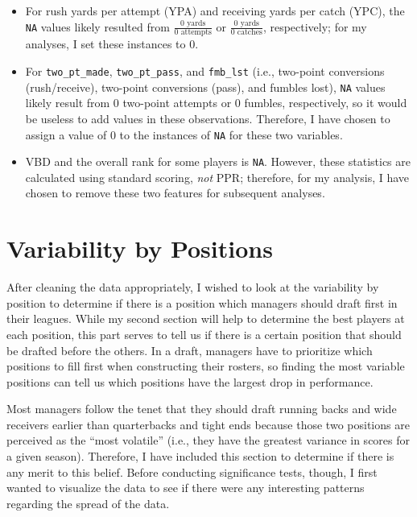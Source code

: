 \documentclass[
]{article}
\providecommand{\tightlist}{%
  \setlength{\itemsep}{0pt}\setlength{\parskip}{0pt}}
\begin{document}
\begin{itemize}
\tightlist
\item
  For rush yards per attempt (YPA) and receiving yards per catch (YPC),
  the \texttt{NA} values likely resulted from
  \(\frac{0 \text{ yards}}{0 \text{ attempts}}\) or
  \(\frac{0 \text{ yards}}{0 \text{ catches}}\), respectively; for my
  analyses, I set these instances to 0.
\item
  For \texttt{two\_pt\_made}, \texttt{two\_pt\_pass}, and
  \texttt{fmb\_lst} (i.e., two-point conversions (rush/receive),
  two-point conversions (pass), and fumbles lost), \texttt{NA} values
  likely result from 0 two-point attempts or 0 fumbles, respectively, so
  it would be useless to add values in these observations. Therefore, I
  have chosen to assign a value of 0 to the instances of \texttt{NA} for
  these two variables.
\item
  VBD and the overall rank for some players is \texttt{NA}. However,
  these statistics are calculated using standard scoring, \emph{not}
  PPR; therefore, for my analysis, I have chosen to remove these two
  features for subsequent analyses.
\end{itemize}

\newpage

\hypertarget{variability-by-positions}{%
\section{Variability by Positions}\label{variability-by-positions}}

After cleaning the data appropriately, I wished to look at the
variability by position to determine if there is a position which
managers should draft first in their leagues. While my second section
will help to determine the best players at each position, this part
serves to tell us if there is a certain position that should be drafted
before the others. In a draft, managers have to prioritize which
positions to fill first when constructing their rosters, so finding the
most variable positions can tell us which positions have the largest
drop in performance.

Most managers follow the tenet that they should draft running backs and
wide receivers earlier than quarterbacks and tight ends because those
two positions are perceived as the ``most volatile'' (i.e., they have
the greatest variance in scores for a given season). Therefore, I have
included this section to determine if there is any merit to this belief.
Before conducting significance tests, though, I first wanted to
visualize the data to see if there were any interesting patterns
regarding the spread of the data.
\end{document}
